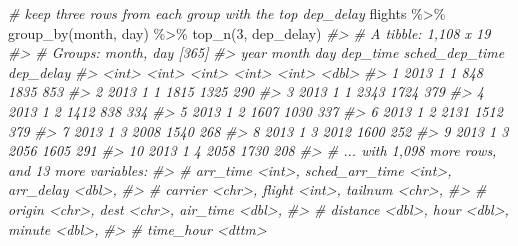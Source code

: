 \documentclass[
]{book}
\newenvironment{Shaded}{\begin{snugshade}}{\end{snugshade}}
\newcommand{\CommentTok}[1]{\textcolor[rgb]{0.56,0.35,0.01}{\textit{#1}}}
\newcommand{\DecValTok}[1]{\textcolor[rgb]{0.00,0.00,0.81}{#1}}
\newcommand{\FunctionTok}[1]{\textcolor[rgb]{0.00,0.00,0.00}{#1}}
\newcommand{\NormalTok}[1]{#1}
\newcommand{\SpecialCharTok}[1]{\textcolor[rgb]{0.00,0.00,0.00}{#1}}
\begin{document}
\begin{Shaded}
\begin{Highlighting}[]
\CommentTok{\# keep three rows from each group with the top dep\_delay}
\NormalTok{flights }\SpecialCharTok{\%\textgreater{}\%} \FunctionTok{group\_by}\NormalTok{(month, day) }\SpecialCharTok{\%\textgreater{}\%} \FunctionTok{top\_n}\NormalTok{(}\DecValTok{3}\NormalTok{, dep\_delay)}
\CommentTok{\#\textgreater{} \# A tibble: 1,108 x 19}
\CommentTok{\#\textgreater{} \# Groups:   month, day [365]}
\CommentTok{\#\textgreater{}     year month   day dep\_time sched\_dep\_time dep\_delay}
\CommentTok{\#\textgreater{}    \textless{}int\textgreater{} \textless{}int\textgreater{} \textless{}int\textgreater{}    \textless{}int\textgreater{}          \textless{}int\textgreater{}     \textless{}dbl\textgreater{}}
\CommentTok{\#\textgreater{}  1  2013     1     1      848           1835       853}
\CommentTok{\#\textgreater{}  2  2013     1     1     1815           1325       290}
\CommentTok{\#\textgreater{}  3  2013     1     1     2343           1724       379}
\CommentTok{\#\textgreater{}  4  2013     1     2     1412            838       334}
\CommentTok{\#\textgreater{}  5  2013     1     2     1607           1030       337}
\CommentTok{\#\textgreater{}  6  2013     1     2     2131           1512       379}
\CommentTok{\#\textgreater{}  7  2013     1     3     2008           1540       268}
\CommentTok{\#\textgreater{}  8  2013     1     3     2012           1600       252}
\CommentTok{\#\textgreater{}  9  2013     1     3     2056           1605       291}
\CommentTok{\#\textgreater{} 10  2013     1     4     2058           1730       208}
\CommentTok{\#\textgreater{} \# ... with 1,098 more rows, and 13 more variables:}
\CommentTok{\#\textgreater{} \#   arr\_time \textless{}int\textgreater{}, sched\_arr\_time \textless{}int\textgreater{}, arr\_delay \textless{}dbl\textgreater{},}
\CommentTok{\#\textgreater{} \#   carrier \textless{}chr\textgreater{}, flight \textless{}int\textgreater{}, tailnum \textless{}chr\textgreater{},}
\CommentTok{\#\textgreater{} \#   origin \textless{}chr\textgreater{}, dest \textless{}chr\textgreater{}, air\_time \textless{}dbl\textgreater{},}
\CommentTok{\#\textgreater{} \#   distance \textless{}dbl\textgreater{}, hour \textless{}dbl\textgreater{}, minute \textless{}dbl\textgreater{},}
\CommentTok{\#\textgreater{} \#   time\_hour \textless{}dttm\textgreater{}}


\end{Highlighting}
\end{Shaded}
\end{document}

